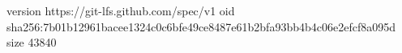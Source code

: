 version https://git-lfs.github.com/spec/v1
oid sha256:7b01b12961bacee1324c0c6bfe49ce8487e61b2bfa93bb4b4c06e2efcf8a095d
size 43840
